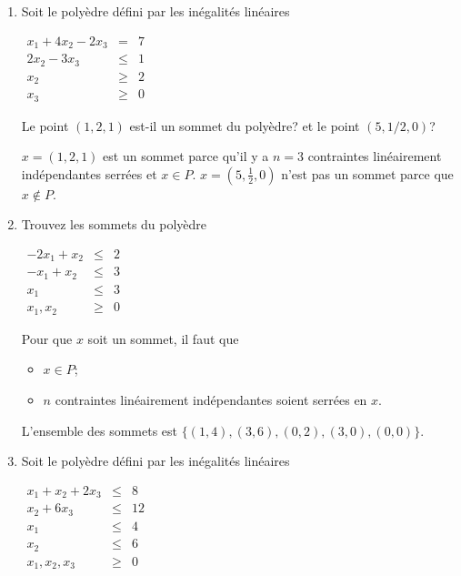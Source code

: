 \begin{enumerate}




  \item Soit le poly\`edre défini par les inégalités linéaires

    $
    \begin{array}{rcr}
      x_1+4 x_2-2x_3 & = & 7\\
      2x_2 -3x_3 & \leq & 1\\
      x_2 & \geq & 2\\
      x_3& \geq & 0
    \end{array}
    $

    Le point $(1, 2, 1)$ est-il un sommet du poly\`edre? et le point $(5, 1/2, 0)$?


    \begin{solution}
      $x = (1,2,1)$ est un sommet parce qu'il y a $n = 3$ contraintes linéairement indépendantes serrées et $x \in P$. $x = (5,\frac{1}{2},0)$ n'est pas un sommet parce que $x \not\in P$.
    \end{solution}


  \item Trouvez les sommets du poly\`edre

    $
    \begin{array}{rcr}
      -2x_1+x_2 & \leq & 2\\
      -x_1+x_2  & \leq & 3\\
      x_1 & \leq & 3\\
      x_1, x_2 & \geq & 0
    \end{array}
    $


    \begin{solution}
      Pour que $x$ soit un sommet, il faut que
      \begin{itemize}
        \item $x \in P$;
        \item $n$ contraintes linéairement indépendantes soient serrées en $x$.
      \end{itemize}
      L'ensemble des sommets est
      $\lbrace(1,4), (3,6), (0,2), (3,0), (0,0)\rbrace$.
    \end{solution}

  \item Soit le poly\`edre défini par les inégalités linéaires

    $
    \begin{array}{rcr}
      x_1+x_2+2x_3 & \leq & 8\\
      x_2 + 6x_3 & \leq & 12\\
      x_1 & \leq & 4\\
      x_2 & \leq & 6\\
      x_1, x_2, x_3 & \geq & 0
    \end{array}
    $


\end{enumerate}
